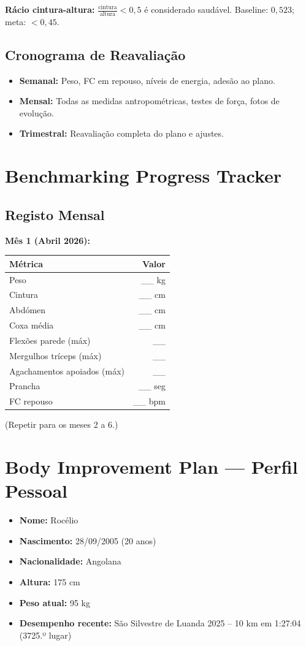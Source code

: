 \documentclass[12pt,a4paper]{scrartcl}
\begin{document}
\textbf{Rácio cintura-altura:} $\frac{\text{cintura}}{\text{altura}} < 0,5$ é considerado saudável. Baseline: $0,523$; meta: $< 0,45$.

\subsection{Cronograma de Reavaliação}
\begin{itemize}
    \item \textbf{Semanal:} Peso, FC em repouso, níveis de energia, adesão ao plano.
    \item \textbf{Mensal:} Todas as medidas antropométricas, testes de força, fotos de evolução.
    \item \textbf{Trimestral:} Reavaliação completa do plano e ajustes.
\end{itemize}

\section{Benchmarking Progress Tracker}
\subsection{Registo Mensal}
\textbf{Mês 1 (Abril 2026):}
\begin{table}[h]
\centering
\begin{tabular}{lr}
\toprule
Métrica & Valor \\
\midrule
Peso & \_\_ kg \\
Cintura & \_\_ cm \\
Abdómen & \_\_ cm \\
Coxa média & \_\_ cm \\
Flexões parede (máx) & \_\_ \\
Mergulhos tríceps (máx) & \_\_ \\
Agachamentos apoiados (máx) & \_\_ \\
Prancha & \_\_ seg \\
FC repouso & \_\_ bpm \\
\bottomrule
\end{tabular}
\end{table}
(Repetir para os meses 2 a 6.)

\section{Body Improvement Plan — Perfil Pessoal}
\begin{itemize}
    \item \textbf{Nome:} Rocélio
    \item \textbf{Nascimento:} 28/09/2005 (20 anos)
    \item \textbf{Nacionalidade:} Angolana
    \item \textbf{Altura:} 175 cm
    \item \textbf{Peso atual:} 95 kg
    \item \textbf{Desempenho recente:} São Silvestre de Luanda 2025 – 10 km em 1:27:04 (3725.º lugar)
\end{itemize}
\end{document}
